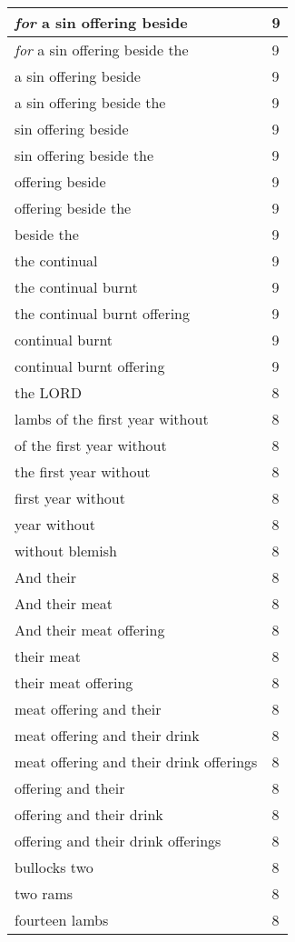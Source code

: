 \begin{center}
\begin{longtable}{|p{3.0in}|p{0.5in}|}
\emph{for} a sin offering beside & 9\\ \hline 
\emph{for} a sin offering beside the & 9\\ \hline 
a sin offering beside & 9\\ \hline 
a sin offering beside the & 9\\ \hline 
sin offering beside & 9\\ \hline 
sin offering beside the & 9\\ \hline 
offering beside & 9\\ \hline 
offering beside the & 9\\ \hline 
beside the & 9\\ \hline 
the continual & 9\\ \hline 
the continual burnt & 9\\ \hline 
the continual burnt offering & 9\\ \hline 
continual burnt & 9\\ \hline 
continual burnt offering & 9\\ \hline 
the LORD & 8\\ \hline 
lambs of the first year without & 8\\ \hline 
of the first year without & 8\\ \hline 
the first year without & 8\\ \hline 
first year without & 8\\ \hline 
year without & 8\\ \hline 
without blemish & 8\\ \hline 
And their & 8\\ \hline 
And their meat & 8\\ \hline 
And their meat offering & 8\\ \hline 
their meat & 8\\ \hline 
their meat offering & 8\\ \hline 
meat offering and their & 8\\ \hline 
meat offering and their drink & 8\\ \hline 
meat offering and their drink offerings & 8\\ \hline 
offering and their & 8\\ \hline 
offering and their drink & 8\\ \hline 
offering and their drink offerings & 8\\ \hline 
bullocks two & 8\\ \hline 
two rams & 8\\ \hline 
fourteen lambs & 8\\ \hline 

\end{longtable}
\end{center}
